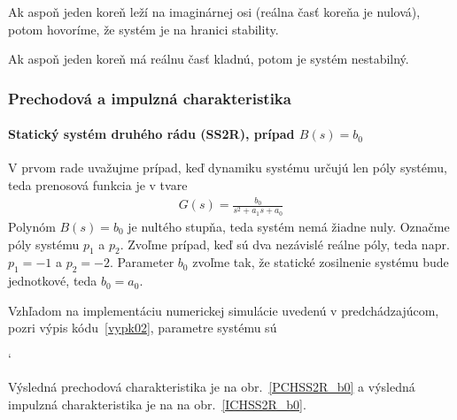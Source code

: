 \documentclass[a4paper, 10pt, ]{article}
\begin{document}
Ak aspoň jeden koreň leží na imaginárnej osi (reálna časť koreňa je nulová), potom hovoríme, že systém je na hranici stability.

Ak aspoň jeden koreň má reálnu časť kladnú, potom je systém nestabilný.








\subsubsection{Prechodová a impulzná charakteristika}



\paragraph{Statický systém druhého rádu (SS2R), prípad $B(s) = b_0$}

V prvom rade uvažujme prípad, keď dynamiku systému určujú len póly systému, teda prenosová funkcia je v tvare
\begin{align}
    G(s) =  \frac{b_0}{s^2 + a_1 s + a_0}
\end{align}
Polynóm $B(s) = b_0$ je nultého stupňa, teda systém nemá žiadne nuly. Označme póly systému $p_1$ a $p_2$. Zvoľme prípad, keď sú dva nezávislé reálne póly, teda napr. $p_1 = -1$ a $p_2 = -2$. Parameter $b_0$ zvoľme tak, že statické zosilnenie systému bude jednotkové, teda $b_0 = a_0$.

Vzhľadom na implementáciu numerickej simulácie uvedenú v predchádzajúcom, pozri výpis kódu~\ref{vypk02}, parametre systému sú
{\catcode`

}
\noindent
Výsledná prechodová charakteristika je na obr.~\ref{PCHSS2R_b0} a výsledná impulzná charakteristika je na na obr.~\ref{ICHSS2R_b0}.


\begin{center}


	\label{PCHSS2R_b0}

\end{center}

\begin{center}


	\label{ICHSS2R_b0}

\end{center}
\end{document}
